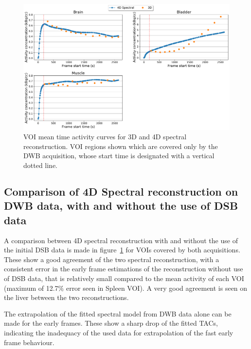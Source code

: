 \begin{figure} [h!]
\centering
\includegraphics[scale=0.5,angle=0]{3_Results/3_3_DWB_Reconstruction/figures/3_3_IsotoPK_CTRL_DWB_3D_vs_4D_peripheral.pdf}
\caption{VOI mean time activity curves for 3D and 4D spectral reconstruction. VOI regions shown which are covered only by the DWB acquisition, whose start time is designated with a vertical dotted line.}
\label{fig_3_3:IsotoPK_CTRL_DWB_4D_vs_3D_Peripheral}
\end{figure} 

\subsection{Comparison of 4D Spectral reconstruction on DWB data, with and without the use of DSB data}
A comparison between 4D spectral reconstruction with and without the use of the initial DSB data is made in figure~\ref{fig_3_3:IsotoPK_CTRL_DWB_4D_vs_3D_Peripheral} for VOIs covered by both acquisitions. These show a good agreement of the two spectral reconstruction, with a consistent error in the early frame estimations of the reconstruction without use of DSB data, that is relatively small compared to the mean activity of each VOI (maximum of 12.7\% error seen in Spleen VOI). A very good agreement is seen on the liver between the two reconstructions.

The extrapolation of the fitted spectral model from DWB data alone can be made for the early frames. These show a sharp drop of the fitted TACs, indicating the inadequacy of the used data for extrapolation of the fast early frame behaviour. 


